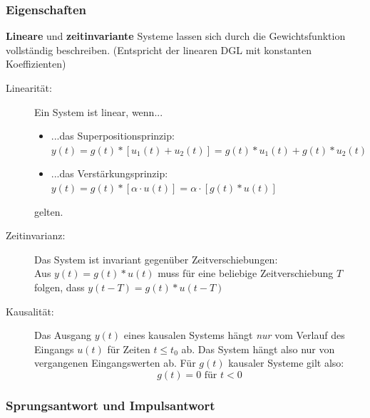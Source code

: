 \message{ !name(Mitschrieb_SysRegel.tex)}\documentclass[12pt,a4paper,ngerman]{scrartcl}
\begin{document}
\subsubsection{Eigenschaften}
\textbf{Lineare} und \textbf{zeitinvariante} Systeme lassen sich durch die Gewichtsfunktion vollständig beschreiben. (Entspricht der linearen DGL mit konstanten Koeffizienten)
\begin{description}
\item[Linearität:] Ein System ist linear, wenn...
  \begin{itemize}
  \item ...das Superpositionsprinzip: $y(t)=g(t)*[u_1(t)+u_2(t)]=g(t)*u_1(t)+ g(t)*u_2(t)$
  \item ...das Verstärkungsprinzip: $y(t)=g(t)*[\alpha \cdot u(t)]= \alpha \cdot[g(t)*u(t)]$
  \end{itemize}
gelten.
\item[Zeitinvarianz:] Das System ist invariant gegenüber Zeitverschiebungen: \\
Aus $y(t)=g(t)*u(t)$ muss für eine beliebige Zeitverschiebung $T$ folgen, dass $y(t-T)=g(t)*u(t-T)$
\item[Kausalität:] Das Ausgang $y(t)$ eines kausalen Systems hängt \emph{nur} vom Verlauf des Eingangs $u(t)$ für Zeiten $t\le t_0$ ab. Das System hängt also nur von vergangenen Eingangswerten ab. Für $g(t)$ kausaler Systeme gilt also:
  \begin{equation*}
    g(t)=0 \text{ für } t<0
  \end{equation*}
\end{description}

\subsubsection{Sprungsantwort und Impulsantwort}
\end{document}
